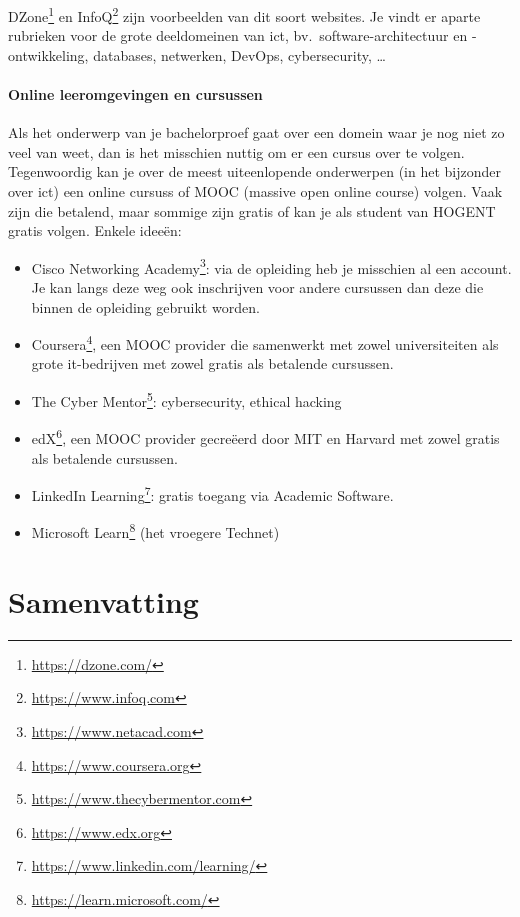 DZone\footnote{\url{https://dzone.com/}} en InfoQ\footnote{\url{https://www.infoq.com}} zijn voorbeelden van dit soort websites. Je vindt er aparte rubrieken voor de grote deeldomeinen van ict, bv.\ software-architectuur en -ont\-wik\-ke\-ling, databases, netwerken, DevOps, cybersecurity, \ldots

\paragraph{Online leeromgevingen en cursussen}

Als het onderwerp van je bachelorproef gaat over een domein waar je nog niet zo veel van weet, dan is het misschien nuttig om er een cursus over te volgen. Tegenwoordig kan je over de meest uiteenlopende onderwerpen (in het bijzonder over ict) een online cursuss of MOOC (massive open online course) volgen. Vaak zijn die betalend, maar sommige zijn gratis of kan je als student van HOGENT gratis volgen. Enkele ideeën:

\begin{itemize}
  \item Cisco Networking Academy\footnote{\url{https://www.netacad.com}}: via de opleiding heb je misschien al een account. Je kan langs deze weg ook inschrijven voor andere cursussen dan deze die binnen de opleiding gebruikt worden.
  \item Coursera\footnote{\url{https://www.coursera.org}}, een MOOC provider die samenwerkt met zowel universiteiten als grote it-bedrijven met zowel gratis als betalende cursussen.
  \item The Cyber Mentor\footnote{\url{https://www.thecybermentor.com}}: cybersecurity, ethical hacking
  \item edX\footnote{\url{https://www.edx.org}}, een MOOC provider gecreëerd door MIT en Harvard met zowel gratis als betalende cursussen.
  \item LinkedIn Learning\footnote{\url{https://www.linkedin.com/learning/}}: gratis toegang via Academic Software.
  \item Microsoft Learn\footnote{\url{https://learn.microsoft.com/}} (het vroegere Technet)
\end{itemize}

\section{Samenvatting}%
\label{sec:literatuuronderzoek_samenvatting}

